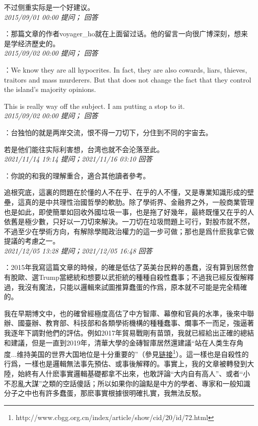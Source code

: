 \documentclass[twocolumn]{ctexart}
\begin{document}
不过侧重实际是一个好建议。\\

\textit{\hfill\noindent\small 2015/09/01 00:00 提问； 回答}

：那篇文章的作者voyager\_ho就在上面留过话。他的留言一向很广博深刻，想来是学经济歷史的。\\

\textit{\hfill\noindent\small 2015/09/02 00:00 提问； 回答}

：We know they are all hypocrites. In fact, they are also cowards, liars, thieves, traitors and mass murderers. But that does not change the fact that they control the island's majority opinions.

This is really way off the subject. I am putting a stop to it.\\

\textit{\hfill\noindent\small 2015/09/02 00:00 提问； 回答}

：台独怕的就是两岸交流，恨不得一刀切下，分住到不同的宇宙去。

若是他们能往实际利害想，台湾也就不会沦落至此。\\

\textit{\hfill\noindent\small 2021/11/14 19:14 提问；2021/11/16 03:10 回答}

：你說的和我的理解重合，適合其他讀者參考。

追根究底，這裏的問題在於懂的人不在乎、在乎的人不懂，又是專業知識形成的壁壘，這真的是中共理性治國哲學的軟肋。除了學術界、金融界之外，一般商業管理也是如此，即使簡單如回收外國垃圾一事，也是拖了好幾年，最終既懂又在乎的人依舊是極少數，只好以一刀切來解決。一刀切在垃圾問題上可行，對股市就不然，不過至少在學術方向，有解除學閥政治權力的這一步可做；那也是爲什麽我拿它做提議的考慮之一。
\\

\textit{\hfill\noindent\small 2021/12/05 13:28 提问；2021/12/05 16:48 回答}

：2015年我寫這篇文章的時候，的確是低估了英美台民粹的愚蠢，沒有算到居然會有脫歐、選Trump當總統和想要以武拒統的種種自殺性蠢事；不過我已經反復解釋過，我沒有魔法，只能以邏輯來試圖推算蠢蛋的作爲，原本就不可能是完全精確的。

我在早期博文中，也的確曾經極度高估了中方智庫、幕僚和官員的水準，後來中聯辦、國臺辦、教育部、科技部和各類學術機構的種種蠢事、爛事不一而足，強逼著我逐年下調對他們的評估。例如2017年貿易戰剛有苗頭，我就已經給出正確的總結和建議，但是一直到2019年，清華大學的金磚智庫居然還建議“站在人类生存角度...维持美国的世界大国地位是十分重要的”（參見\href{http://www.cbgg.org.cn/index/article/show/cid/20/id/72.html}{链接\footnote{\url{http://www.cbgg.org.cn/index/article/show/cid/20/id/72.html}}}）。這一樣也是自殺性的行爲，一樣也是邏輯無法事先預估、或事後解釋的。事實上，我的文章被轉發到大陸，始終有人什麽事實邏輯基礎都拿不出來，也敢評論“大内自有高人”、或者“小不忍亂大謀”之類的空話傻話；所以如果你的論點是中方的學者、專家和一般知識分子之中也有許多蠢蛋，那麽事實根據很明確扎實，我無法反駁。
\end{document}
